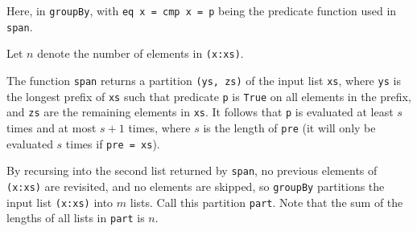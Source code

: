 \documentclass[../main.tex]{subfiles}
\begin{document}

Here,  in \texttt{groupBy}, with \texttt{eq x = cmp x = p} being the predicate function used in \texttt{span}. %







Let $n$ denote the number of elements in \texttt{(x:xs)}.

The function \texttt{span} returns a partition \texttt{(ys, zs)} of the input list \texttt{xs}, where \texttt{ys} is the longest prefix of \texttt{xs} such that predicate \texttt{p} is \texttt{True} on all elements in the prefix, and \texttt{zs} are the remaining elements in \texttt{xs}.  It follows that \texttt{p} is evaluated at least $s$ times and at most $s + 1$ times, where $s$ is the length of \texttt{pre} (it will only be evaluated $s$ times if \texttt{pre = xs}).

By recursing into the second list returned by \texttt{span}, no previous elements of \texttt{(x:xs)} are revisited, and no elements are skipped, so \texttt{groupBy} partitions the input list \texttt{(x:xs)} into $m$ lists.  Call this partition \texttt{part}.  Note that the sum of the lengths of all lists in \texttt{part} is $n$.
\end{document}
